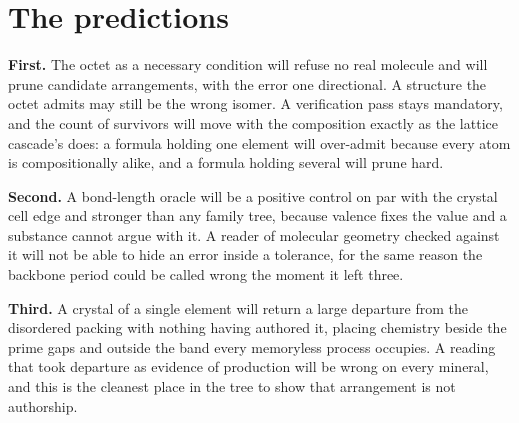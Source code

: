 \section{The predictions}

\textbf{First.} The octet as a necessary condition will refuse no real molecule and will prune
candidate arrangements, with the error one directional. A structure the octet admits may still be the
wrong isomer. A verification pass stays mandatory, and the count of survivors will move with the
composition exactly as the lattice cascade's does: a formula holding one element will over-admit
because every atom is compositionally alike, and a formula holding several will prune hard.

\textbf{Second.} A bond-length oracle will be a positive control on par with the crystal cell edge
and stronger than any family tree, because valence fixes the value and a substance cannot argue with
it. A reader of molecular geometry checked against it will not be able to hide an error inside a
tolerance, for the same reason the backbone period could be called wrong the moment it left three.

\textbf{Third.} A crystal of a single element will return a large departure from the disordered
packing with nothing having authored it, placing chemistry beside the prime gaps and outside the band
every memoryless process occupies. A reading that took departure as evidence of production will be
wrong on every mineral, and this is the cleanest place in the tree to show that arrangement is not
authorship.

